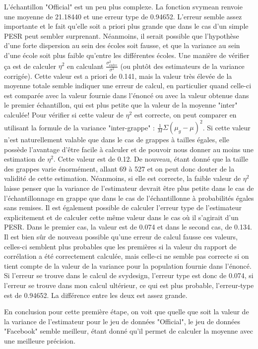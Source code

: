 \documentclass[11pt,a4paper]{report}
\begin{document}
L'échantillon "Official" est un peu plus complexe. La fonction svymean renvoie une moyenne de 21.18440 et une erreur type de 0.94652. L'erreur semble assez importante et le fait qu'elle soit a priori plus grande que dans le cas d'un simple PESR peut sembler surprenant. Néanmoins, il serait possible que l'hypothèse d'une forte dispersion au sein des écoles soit fausse, et que la variance au sein d'une école soit plus faible qu'entre les différentes écoles. Une manière de vérifier ça est de calculer $\eta^2$ en calculant $\frac{\sigma^2_{entre}}{\sigma^2}$ (ou plutôt des estimateurs de la variance corrigée). Cette valeur est a priori de 0.141, mais la valeur très élevée de la moyenne totale semble indiquer une erreur de calcul, en particulier quand celle-ci est comparée avec la valeur fournie dans l'énoncé ou avec la valeur obtenue dans le premier échantillon, qui est plus petite que la valeur de la moyenne "inter" calculée! Pour vérifier si cette valeur de $\eta^2$ est correcte, on peut comparer en utilisant la formule de la variance "inter-grappe" : $ \frac{1}{M}\Sigma(\mu_g -\mu)^2$. Si cette valeur n'est naturellement valable que dans le cas de grappes à tailles égales, elle possède l'avantage d'être facile à calculer et de pouvoir nous donner au moins une estimation de $\eta^2$. Cette valeur est de 0.12. De nouveau, étant donné que la taille des grappes varie énormément, allant 69 à 527 et on peut donc douter de la validité de cette estimation. Néanmoins, si elle est correcte, la faible valeur de $\eta^2$ laisse penser que la variance de l'estimateur devrait être plus petite dans le cas de l'échantillonnage en grappe que dans le cas de l'échantillonne à probabilités égales sans remises. Il est également possible de calculer l'erreur type de l'estimateur explicitement et de calculer cette même valeur dans le cas où il s'agirait d'un PESR. Dans le premier cas, la valeur est de 0.074 et dans le second cas, de 0.134. Il est bien sûr de nouveau possible qu'une erreur de calcul fausse ces valeurs, celles-ci semblent plus probables que les premières si la valeur du rapport de corrélation a été correctement calculée, mais celle-ci ne semble pas correcte si on tient compte de la valeur de la variance pour la population fournie dans l'énoncé. Si l'erreur se trouve dans le calcul de svydesign, l'erreur type est donc de 0.074, si l'erreur se trouve dans mon calcul ultérieur, ce qui est plus probable, l'erreur-type est de 0.94652. La différence entre les deux est assez grande.\bigskip

En conclusion pour cette première étape, on voit que quelle que soit la valeur de la variance de l'estimateur pour le jeu de données "Official", le jeu de données "Facebook" semble meilleur, étant donné qu'il permet de calculer la moyenne avec une meilleure précision.
\end{document}
